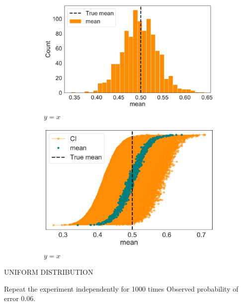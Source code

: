 \documentclass[twoside,onecolumn]{article}
\theoremstyle{definition}
\begin{document}
\begin{figure} \centering
\begin{subfigure}{0.5\textwidth}
         \includegraphics[width=\textwidth]{../figs/mean_distr_unif.pdf}
         \caption{$y=x$}\label{fig:y equals x}
     \end{subfigure}
     \begin{subfigure}{0.45\textwidth}
         \includegraphics[width=\textwidth]{../figs/unif_mean_CI.pdf}
         \caption{$y=x$}
         \label{fig:y equals x}
     \end{subfigure}
    
  \caption{}\label{fig:ci_unif_mean}
\end{figure}



UNIFORM DISTRIBUTION


Repeat the experiment independently for 1000 times
Observed probability of error 0.06.
\end{document}
